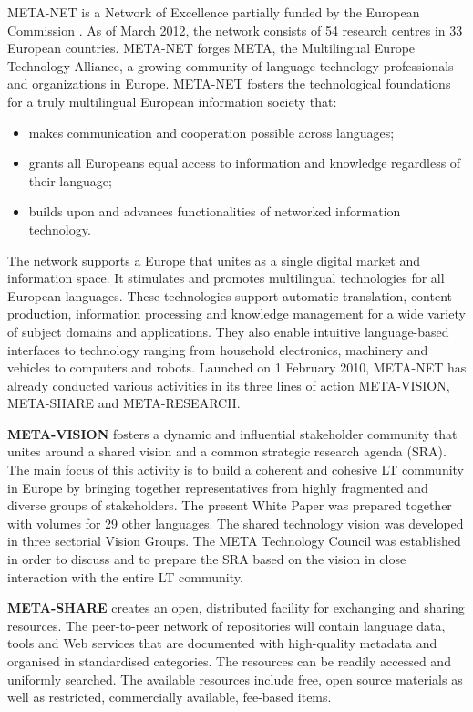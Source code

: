 \begin{multicols}{2}
META-NET is a Network of Excellence partially funded by the European Commission \cite{rehm2011}. As of March 2012, the network consists of 54 research centres in 33 European countries. META-NET forges META, the Multilingual Europe Technology Alliance, a growing community of language technology professionals and organizations in Europe. META-NET fosters the technological foundations for a truly multilingual European information society that:

\begin{itemize}
\item makes communication and cooperation possible across languages;
\item grants all Europeans equal access to information and knowledge regardless of their language;
\item builds upon and advances functionalities of networked information technology.
\end{itemize}

The network supports a Europe that unites as a single digital market and information space. It stimulates and promotes multilingual technologies for all European languages. These technologies support automatic translation, content production, information processing and knowledge management for a wide variety of subject domains and applications. They also enable intuitive language-based interfaces to technology ranging from household electronics, machinery and vehicles to computers and robots.
Launched on 1 February 2010, META-NET has already conducted various activities in its three lines of action META-VISION, META-SHARE and META-RESEARCH.

\textbf{META-VISION} fosters a dynamic and influential stakeholder community that unites around a shared vision and a common strategic research agenda (SRA). The main focus of this activity is to build a coherent and cohesive LT community in Europe by bringing together representatives from highly fragmented and diverse groups of stakeholders. The present White Paper was prepared together with volumes for 29 other languages. The shared technology vision was developed in three sectorial Vision Groups. The META Technology Council was established in order to discuss and to prepare the SRA based on the vision in close interaction with the entire LT community.

\textbf{META-SHARE} creates an open, distributed facility for exchanging and sharing resources. The peer-to-peer network of repositories will contain language data, tools and Web services that are documented with high-quality metadata and organised in standardised categories. The resources can be readily accessed and uniformly searched. The available resources include free, open source materials as well as restricted, commercially available, fee-based items.


\end{multicols}
